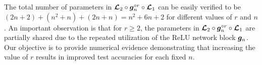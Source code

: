 \documentclass[nohyperref]{article}
\theoremstyle{plain}
\theoremstyle{definition}
\theoremstyle{remark}
\begin{document}
The total number of parameters in ${\bm{\mathcal{L}}}_2\circ {\bm{g}}_n^{\circ r}\circ {\bm{\mathcal{L}}}_1$ can be easily verified to be $(2n+2)+(n^2+n)+(2n+n)=n^2+6n+2$ for different values of $r$ and $n$.
An important observation is that for $r\geq 2$, the parameters in ${\bm{\mathcal{L}}}_2\circ {\bm{g}}_n^{\circ r}\circ {\bm{\mathcal{L}}}_1$ are partially shared due to the repeated utilization of the ReLU network block ${\bm{g}}_n$.
Our objective is to provide numerical evidence demonstrating that increasing the value of $r$ results in improved test accuracies  for each fixed $n$.
\end{document}
